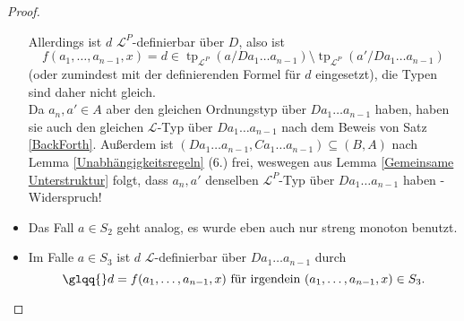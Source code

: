 \documentclass[a4paper, 11pt]{report}
\newcommand{\lingua}{\mathcal{L}}
\DeclareMathOperator{\tp}{tp}
\theoremstyle{definition}
\begin{document}
\begin{proof}
\begin{itemize}
		Allerdings ist $d$ $\lingua^P$-definierbar über $D$, also ist $$f(a_1,\dots,a_{n-1},x)=d\in\tp_{\lingua^P}(a/Da_1\dots a_{n-1})\setminus\tp_{\lingua^P}(a'/Da_1\dots a_{n-1})$$ (oder zumindest mit der definierenden Formel für $d$ eingesetzt), die Typen sind daher nicht gleich.\\
		Da $a_n,a'\in A$ aber den gleichen Ordnungstyp über $Da_1\dots a_{n-1}$ haben, haben sie auch den gleichen $\lingua$-Typ über $Da_1\dots a_{n-1}$ nach dem Beweis von Satz \ref{BackForth}. Außerdem ist $(Da_1\dots a_{n-1},Ca_1\dots a_{n-1})\subseteq(B,A)$ nach Lemma \ref{Unabhängigkeitsregeln} (6.) frei, weswegen aus Lemma \ref{Gemeinsame Unterstruktur} folgt, dass $a_n,a'$ denselben $\lingua^P$-Typ über $Da_1\dots a_{n-1}$ haben - Widerspruch!
		\item Das Fall $a\in S_2$ geht analog, es wurde eben auch nur streng monoton benutzt.
		\item Im Falle $a\in S_3$ ist $d$ $\lingua$-definierbar über $Da_1\dots a_{n-1}$ durch $$\glqq{}d=f(a_1,\dots,a_{n-1},x)\text{ für irgendein }(a_1,\dots,a_{n-1},x)\in S_3.$$
	\end{itemize}
\end{proof}
\end{document}
